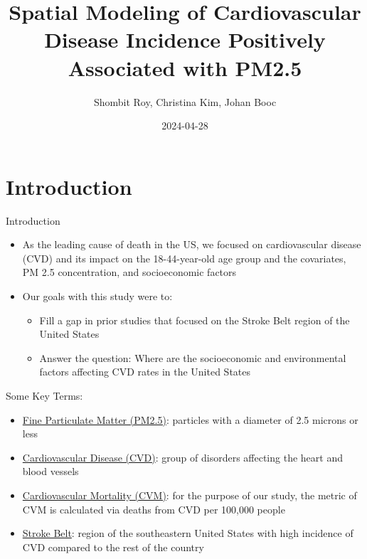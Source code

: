 \documentclass[
  ignorenonframetext,
]{beamer}
\title{Spatial Modeling of Cardiovascular Disease Incidence Positively
Associated with PM2.5}
\author{Shombit Roy, Christina Kim, Johan Booc}
\date{2024-04-28}
\providecommand{\tightlist}{%
  \setlength{\itemsep}{0pt}\setlength{\parskip}{0pt}}\usepackage{longtable,booktabs,array}
\begin{document}
\frame{\titlepage}

\section{Introduction}\label{introduction}

\begin{frame}{Introduction}
\label{introduction-1}
\begin{itemize}
\tightlist
\item
  As the leading cause of death in the US, we focused on cardiovascular
  disease (CVD) and its impact on the 18-44-year-old age group and the
  covariates, PM 2.5 concentration, and socioeconomic factors~
\item
  Our goals with this study were to:

  \begin{itemize}
  \tightlist
  \item
    Fill a gap in prior studies that focused on the Stroke Belt region
    of the United States
  \item
    Answer the question: Where are the socioeconomic and environmental
    factors affecting CVD rates in the United States
  \end{itemize}
\end{itemize}
\end{frame}

\begin{frame}{Some Key Terms:}
\label{some-key-terms}
\begin{itemize}
\item
  \ul{Fine Particulate Matter (PM2.5)}: particles with a diameter of 2.5
  microns or less
\item
  \ul{Cardiovascular Disease (CVD)}: group of disorders affecting the
  heart and blood vessels
\item
  \ul{Cardiovascular Mortality (CVM)}: for the purpose of our study, the
  metric of CVM is calculated via deaths from CVD per 100,000 people
\item
  \ul{Stroke Belt}: region of the southeastern United States with high
  incidence of CVD compared to the rest of the country
\end{itemize}
\end{frame}
\end{document}
